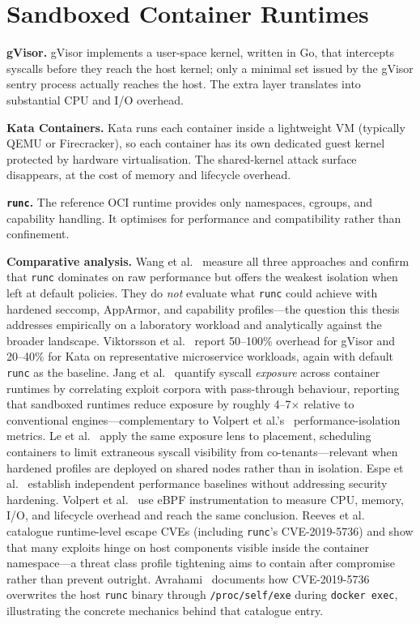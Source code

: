 \section{Sandboxed Container Runtimes}

\textbf{gVisor.} gVisor implements a user-space kernel, written in Go, that intercepts syscalls before they reach the host kernel; only a minimal set issued by the gVisor sentry process actually reaches the host. The extra layer translates into substantial CPU and I/O overhead.

\textbf{Kata Containers.} Kata runs each container inside a lightweight VM (typically QEMU or Firecracker), so each container has its own dedicated guest kernel protected by hardware virtualisation. The shared-kernel attack surface disappears, at the cost of memory and lifecycle overhead.

\textbf{\texttt{runc}.} The reference OCI runtime provides only namespaces, cgroups, and capability handling. It optimises for performance and compatibility rather than confinement.

\textbf{Comparative analysis.} Wang et al.~\cite{wang2022} measure all three approaches and confirm that \texttt{runc} dominates on raw performance but offers the weakest isolation when left at default policies. They do \emph{not} evaluate what \texttt{runc} could achieve with hardened seccomp, AppArmor, and capability profiles---the question this thesis addresses empirically on a laboratory workload and analytically against the broader landscape. Viktorsson et al.~\cite{viktorsson2020} report 50--100\% overhead for gVisor and 20--40\% for Kata on representative microservice workloads, again with default \texttt{runc} as the baseline. Jang et al.~\cite{jang2022secquant} quantify syscall \emph{exposure} across container runtimes by correlating exploit corpora with pass-through behaviour, reporting that sandboxed runtimes reduce exposure by roughly 4--7$\times$ relative to conventional engines---complementary to Volpert et al.'s~\cite{volpert2024} performance-isolation metrics. Le et al.~\cite{le2023sysched} apply the same exposure lens to placement, scheduling containers to limit extraneous syscall visibility from co-tenants---relevant when hardened profiles are deployed on shared nodes rather than in isolation. Espe et al.~\cite{espe2020} establish independent performance baselines without addressing security hardening. Volpert et al.~\cite{volpert2024} use eBPF instrumentation to measure CPU, memory, I/O, and lifecycle overhead and reach the same conclusion. Reeves et al.~\cite{reeves2021runtime} catalogue runtime-level escape CVEs (including \texttt{runc}'s CVE-2019-5736) and show that many exploits hinge on host components visible inside the container namespace---a threat class profile tightening aims to contain after compromise rather than prevent outright. Avrahami~\cite{unit42cve20195736} documents how CVE-2019-5736 overwrites the host \texttt{runc} binary through \texttt{/proc/self/exe} during \texttt{docker exec}, illustrating the concrete mechanics behind that catalogue entry.

